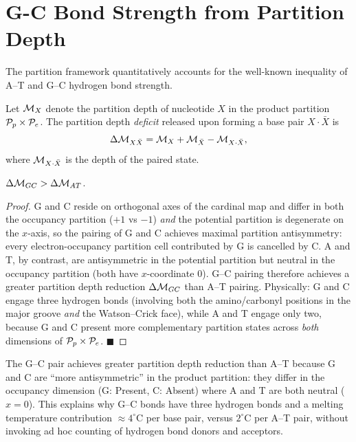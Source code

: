 \section{G-C Bond Strength from Partition Depth}
\label{sec:bond_strength}

The partition framework quantitatively accounts for the well-known
inequality of A--T and G--C hydrogen bond strength.

\begin{definition}
\label{def:pair_depth}
Let $\mathcal{M}_X$ denote the partition depth of nucleotide $X$ in the
product partition $\mathcal{P}_p \times \mathcal{P}_e$. The partition depth
\emph{deficit} released upon forming a base pair $X \cdot \bar{X}$ is
\begin{equation}
  \Delta\mathcal{M}_{X\bar{X}} = \mathcal{M}_X + \mathcal{M}_{\bar{X}} - \mathcal{M}_{X\cdot\bar{X}},
\end{equation}
where $\mathcal{M}_{X\cdot\bar{X}}$ is the depth of the paired state.
\end{definition}

\begin{proposition}
\label{prop:gc_stronger}
$\Delta\mathcal{M}_{GC} > \Delta\mathcal{M}_{AT}$.
\end{proposition}

\begin{proof}
G and C reside on orthogonal axes of the cardinal map and differ in both
the occupancy partition ($+1$ vs $-1$) \emph{and} the potential partition
is degenerate on the $x$-axis, so the pairing of G and C achieves maximal
partition antisymmetry: every electron-occupancy partition cell contributed
by G is cancelled by C. A and T, by contrast, are antisymmetric in the
potential partition but neutral in the occupancy partition (both have
$x$-coordinate 0). G--C pairing therefore achieves a greater partition
depth reduction $\Delta\mathcal{M}_{GC}$ than A--T pairing. Physically: G
and C engage three hydrogen bonds (involving both the amino/carbonyl
positions in the major groove \emph{and} the Watson--Crick face), while
A and T engage only two, because G and C present more complementary
partition states across \emph{both} dimensions of $\mathcal{P}_p \times \mathcal{P}_e$.
$\blacksquare$
\end{proof}

\begin{keyresult}
The G--C pair achieves greater partition depth reduction than A--T because
G and C are ``more antisymmetric'' in the product partition: they differ
in the occupancy dimension (G: Present, C: Absent) where A and T are
both neutral ($x = 0$). This explains why G--C bonds have three hydrogen
bonds and a melting temperature contribution $\approx 4^\circ$C per
base pair, versus $2^\circ$C per A--T pair, without invoking ad hoc
counting of hydrogen bond donors and acceptors.
\end{keyresult}

